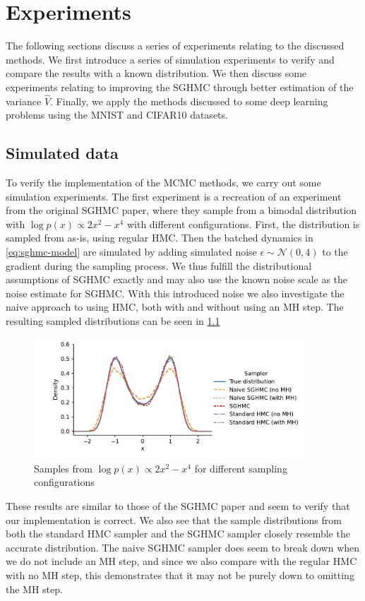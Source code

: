 \chapter{Experiments}

The following sections discuss a series of experiments relating to the discussed methods. 
We first introduce a series of simulation experiments to verify and compare the results with a known distribution.
We then discuss some experiments relating to improving the SGHMC through better estimation of the variance $\hat{V}$.
Finally, we apply the methods discussed to some deep learning problems using the MNIST and CIFAR10 datasets.

\section{Simulated data}

To verify the implementation of the MCMC methods, we carry out some simulation experiments.
The first experiment is a recreation of an experiment from the original SGHMC paper, where they sample from a bimodal distribution with $\log p(x) \propto 2 x^2 - x^ 4$ with different configurations. 
First, the distribution is sampled from as-is, using regular HMC.
Then the batched dynamics in \cref{eq:sghmc-model} are simulated by adding simulated noise $\epsilon \sim \mathcal{N}(0, 4)$ to the gradient during the sampling process. 
We thus fulfill the distributional assumptions of SGHMC exactly and may also use the known noise scale as the noise estimate for SGHMC. 
With this introduced noise we also investigate the naive approach to using HMC, both with and without using an MH step. 
The resulting sampled distributions can be seen in \cref{fig:synthetic}
\begin{figure}[htb]
    \centering
    \includegraphics[width=0.9\textwidth]{Figures/synthetic.pdf}
    \caption{Samples from $\log p(x) \propto 2 x^2 - x^ 4$ for different sampling configurations}
    \label{fig:synthetic}
\end{figure}
These results are similar to those of the SGHMC paper and seem to verify that our implementation is correct.
We also see that the sample distributions from both the standard HMC sampler and the SGHMC sampler closely resemble the accurate distribution. 
The naive SGHMC sampler does seem to break down when we do not include an  MH step, and since we also compare with the regular HMC with no MH step, this demonstrates that it may not be purely down to omitting the MH step. 

